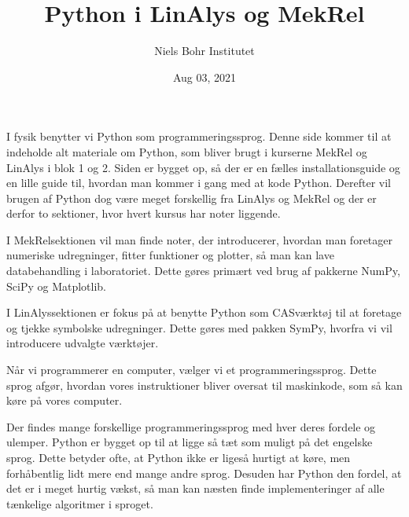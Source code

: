 \documentclass[letterpaper,10pt,english]{jupyterBook}
\title{Python i LinAlys og MekRel}
\date{Aug 03, 2021}
\author{Niels Bohr Institutet}
\begin{document}
\pagestyle{empty}
\sphinxmaketitle
\pagestyle{plain}
\sphinxtableofcontents
\pagestyle{normal}
\label{\detokenize{intro::doc}}





I fysik benytter vi Python som programmeringssprog. Denne side kommer til at indeholde alt materiale om Python, som bliver brugt i kurserne MekRel og LinAlys i blok 1 og 2. Siden er bygget op, så der er en fælles installationsguide og en lille guide til, hvordan man kommer i gang med at kode Python. Derefter vil brugen af Python dog være meget forskellig fra LinAlys og MekRel og der er derfor to sektioner, hvor hvert kursus har noter liggende.

I MekRel\sphinxhyphen{}sektionen vil man finde noter, der introducerer, hvordan man foretager numeriske udregninger, fitter funktioner og plotter, så man kan lave databehandling i laboratoriet. Dette gøres primært ved brug af pakkerne NumPy, SciPy og Matplotlib.

I LinAlys\sphinxhyphen{}sektionen er fokus på at benytte Python som CAS\sphinxhyphen{}værktøj til at foretage og tjekke symbolske udregninger. Dette gøres med pakken SymPy, hvorfra vi vil introducere udvalgte værktøjer.

\begin{DUlineblock}{0em}
\item[] 
\end{DUlineblock}

Når vi programmerer en computer, vælger vi et programmeringssprog. Dette sprog afgør, hvordan vores instruktioner bliver oversat til maskinkode, som så kan køre på vores computer.

Der findes mange forskellige programmeringssprog med hver deres fordele og ulemper. Python er bygget op til at ligge så tæt som muligt på det engelske sprog.  Dette betyder ofte, at Python ikke er ligeså hurtigt at køre, men forhåbentlig lidt mere  end mange andre sprog. Desuden har Python den fordel, at det er i meget hurtig vækst, så man kan næsten finde implementeringer af alle tænkelige algoritmer i sproget.

\begin{DUlineblock}{0em}
\item[] 
\end{DUlineblock}
\end{document}
